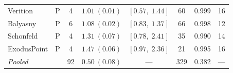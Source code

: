 \documentclass[10pt,onecolumn]{article}
\begin{document}
\begin{table}[t]
\begin{tabular}{@{}llcccccr@{}}
  Verition           & P & 4  & $1.01~(0.01)$ & $[0.57,\;1.44]$  & 60  & 0.999 & 16  \\
  Balyasny           & P & 6  & $1.08~(0.02)$ & $[0.83,\;1.37]$  & 66  & 0.998 & 12  \\
  Schonfeld          & P & 4  & $1.31~(0.07)$ & $[0.78,\;2.41]$  & 35  & 0.990 & 14  \\
  ExodusPoint        & P & 4  & $1.47~(0.06)$ & $[0.97,\;2.36]$  & 21  & 0.995 & 16  \\
  \midrule\midrule
  \textit{Pooled}    &   & 92 & $0.50~(0.08)$ & ---              & 329 & 0.382 & --- \\
  \bottomrule
\end{tabular}
\end{table}

\end{document}
